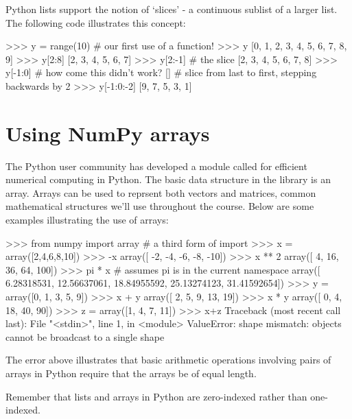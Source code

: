 Python lists support the notion of `slices' - a continuous sublist of a
larger list. The following code illustrates this concept:
%
\begin{python}
>>> y = range(10)  # our first use of a function!
>>> y
[0, 1, 2, 3, 4, 5, 6, 7, 8, 9]
>>> y[2:8]
[2, 3, 4, 5, 6, 7]
>>> y[2:-1] # the slice
[2, 3, 4, 5, 6, 7, 8]
>>> y[-1:0] # how come this didn't work? 
[]
# slice from last to first, stepping backwards by 2
>>> y[-1:0:-2]  
[9, 7, 5, 3, 1]
\end{python}

\section{Using NumPy arrays}

The Python user community has developed a module called \numpy for efficient numerical computing in Python.  The basic data structure in the \numpy library is an array. Arrays can be used to reprsent both vectors and matrices, common mathematical structures we'll use throughout the course. Below are some examples illustrating the use of \numpy arrays:
\begin{python}
>>> from numpy import array # a third form of import 
>>> x = array([2,4,6,8,10])
>>> -x
array([ -2,  -4,  -6,  -8, -10])
>>> x ** 2
array([  4,  16,  36,  64, 100])
>>> pi * x # assumes pi is in the current namespace
array([  6.28318531,  12.56637061,  18.84955592,  25.13274123,  31.41592654])
>>> y = array([0, 1, 3, 5, 9])
>>> x + y
array([ 2,  5,  9, 13, 19])
>>> x * y
array([ 0,  4, 18, 40, 90])
>>> z = array([1, 4, 7, 11])
>>> x+z
Traceback (most recent call last):
  File "<stdin>", line 1, in <module>
ValueError: shape mismatch: objects cannot be broadcast to a single shape
\end{python}
%
The error above illustrates that basic arithmetic operations involving pairs of \numpy arrays in Python require that the arrays be of equal length.

Remember that lists and arrays in Python are zero-indexed rather than
one-indexed.
%

